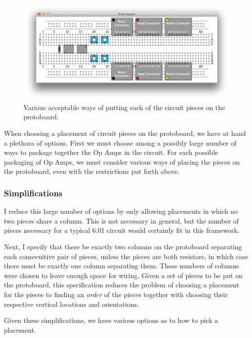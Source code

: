 \begin{figure}
\begin{center}
\includegraphics[width=\linewidth]{Images/piece_placement_options.png}
\caption{Various acceptable ways of putting each of the circuit pieces on the
protoboard.}
\label{fig:piece_placement}
\end{center}
\end{figure}

When choosing a placement of circuit pieces on the protoboard, we have at hand a
plethora of options. First we must choose among a possibly large number of ways
to package together the Op Amps in the circuit. For each possible packaging of
Op Amps, we must consider various ways of placing the pieces on the protoboard,
even with the restrictions put forth above.

\subsubsection{Simplifications}

I reduce this large number of options by only allowing placements in which no
two pieces share a column. This is not necessary in general, but the
number of pieces necessary for a typical 6.01 circuit would certainly fit in
this framework.

Next, I specify that there be exactly two columns on the protoboard separating
each consecuitive pair of pieces, unless the pieces are both resistors, in which
case there must be exactly one column separating them. These numbers of columns
were chosen to leave enough space for wiring. Given a set of pieces to be put on
the protoboard, this specification reduces the
problem of choosing a placement for the pieces to finding an \emph{order} of the
pieces together with choosing their respective vertical locations and
orientations.

Given these simplifications, we have various options as to how to pick a
placement.

